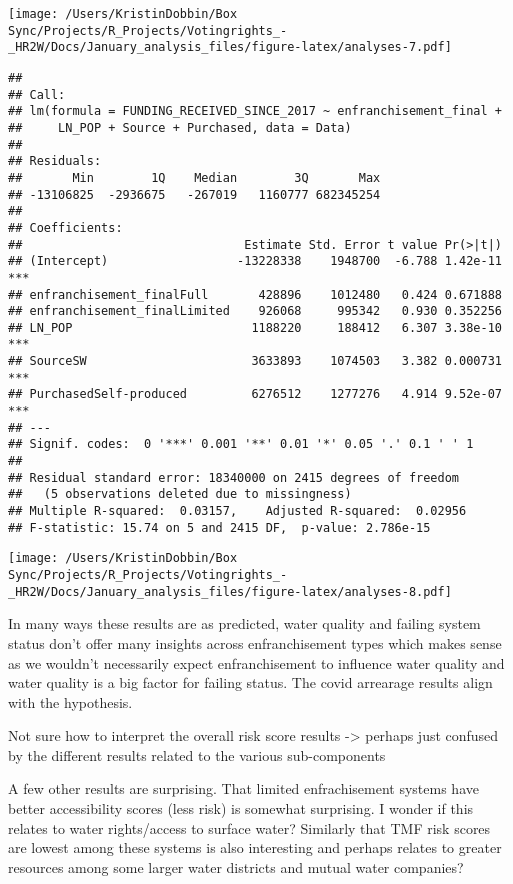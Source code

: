 \documentclass[
]{article}
\begin{document}
\texttt{[image: /Users/KristinDobbin/Box Sync/Projects/R\_Projects/Votingrights\_-\_HR2W/Docs/January\_analysis\_files/figure-latex/analyses-7.pdf]}

\begin{verbatim}
## 
## Call:
## lm(formula = FUNDING_RECEIVED_SINCE_2017 ~ enfranchisement_final + 
##     LN_POP + Source + Purchased, data = Data)
## 
## Residuals:
##       Min        1Q    Median        3Q       Max 
## -13106825  -2936675   -267019   1160777 682345254 
## 
## Coefficients:
##                               Estimate Std. Error t value Pr(>|t|)    
## (Intercept)                  -13228338    1948700  -6.788 1.42e-11 ***
## enfranchisement_finalFull       428896    1012480   0.424 0.671888    
## enfranchisement_finalLimited    926068     995342   0.930 0.352256    
## LN_POP                         1188220     188412   6.307 3.38e-10 ***
## SourceSW                       3633893    1074503   3.382 0.000731 ***
## PurchasedSelf-produced         6276512    1277276   4.914 9.52e-07 ***
## ---
## Signif. codes:  0 '***' 0.001 '**' 0.01 '*' 0.05 '.' 0.1 ' ' 1
## 
## Residual standard error: 18340000 on 2415 degrees of freedom
##   (5 observations deleted due to missingness)
## Multiple R-squared:  0.03157,    Adjusted R-squared:  0.02956 
## F-statistic: 15.74 on 5 and 2415 DF,  p-value: 2.786e-15
\end{verbatim}

\texttt{[image: /Users/KristinDobbin/Box Sync/Projects/R\_Projects/Votingrights\_-\_HR2W/Docs/January\_analysis\_files/figure-latex/analyses-8.pdf]}

In many ways these results are as predicted, water quality and failing
system status don't offer many insights across enfranchisement types
which makes sense as we wouldn't necessarily expect enfranchisement to
influence water quality and water quality is a big factor for failing
status. The covid arrearage results align with the hypothesis.

Not sure how to interpret the overall risk score results -\textgreater{}
perhaps just confused by the different results related to the various
sub-components

A few other results are surprising. That limited enfrachisement systems
have better accessibility scores (less risk) is somewhat surprising. I
wonder if this relates to water rights/access to surface water?
Similarly that TMF risk scores are lowest among these systems is also
interesting and perhaps relates to greater resources among some larger
water districts and mutual water companies?
\end{document}
